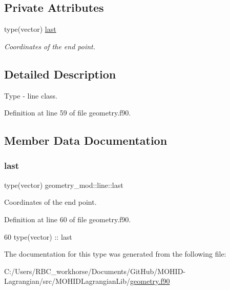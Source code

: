 \subsection*{Private Attributes}
\begin{DoxyCompactItemize}
\item 
type(vector) \mbox{\hyperlink{structgeometry__mod_1_1line_a1f7c879c60698c2f903f5258ad6f446c}{last}}
\begin{DoxyCompactList}\small\item\em Coordinates of the end point. \end{DoxyCompactList}\end{DoxyCompactItemize}


\subsection{Detailed Description}
Type -\/ line class. 

Definition at line 59 of file geometry.\+f90.



\subsection{Member Data Documentation}
\mbox{\label{structgeometry__mod_1_1line_a1f7c879c60698c2f903f5258ad6f446c}} 
\subsubsection{\texorpdfstring{last}{last}}
{\footnotesize\ttfamily type(vector) geometry\+\_\+mod\+::line\+::last\hspace{0.3cm}{\ttfamily [private]}}



Coordinates of the end point. 



Definition at line 60 of file geometry.\+f90.


\begin{DoxyCode}
60         \textcolor{keywordtype}{type}(vector) :: last
\end{DoxyCode}


The documentation for this type was generated from the following file\+:\begin{DoxyCompactItemize}
\item 
C\+:/\+Users/\+R\+B\+C\+\_\+workhorse/\+Documents/\+Git\+Hub/\+M\+O\+H\+I\+D-\/\+Lagrangian/src/\+M\+O\+H\+I\+D\+Lagrangian\+Lib/\mbox{\hyperlink{geometry_8f90}{geometry.\+f90}}\end{DoxyCompactItemize}
